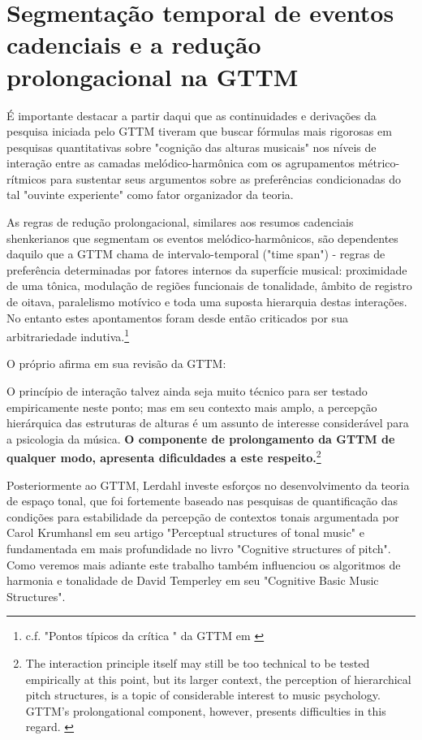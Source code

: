 \documentclass[
	12pt,				%
	openright,			%
	twoside,			%
	a4paper,			%
	english,			%
	french,				%
	spanish,			%
	brazil				%
	]{abntex2}
\begin{document}
\section{Segmentação temporal de eventos cadenciais e a redução prolongacional na GTTM}


É importante destacar a partir daqui que as continuidades e derivações da pesquisa iniciada pelo GTTM tiveram que buscar fórmulas mais rigorosas em pesquisas quantitativas sobre "cognição das alturas musicais"\cite{krumhansl1990cognitive} nos níveis de interação entre as camadas melódico-harmônica com os agrupamentos métrico-rítmicos para sustentar seus argumentos sobre as preferências condicionadas do tal "ouvinte experiente"\cite[pg. 118]{lerdahl1983generative} como fator organizador da teoria. 

As regras de redução prolongacional, similares aos resumos cadenciais shenkerianos que segmentam os eventos melódico-harmônicos, são dependentes daquilo que a GTTM chama de intervalo-temporal ("time span") - regras de preferência determinadas por fatores internos da superfície musical: proximidade de uma tônica, modulação de regiões funcionais de tonalidade, âmbito de registro de oitava, paralelismo motívico e toda uma suposta hierarquia destas interações. No entanto estes apontamentos foram desde então criticados por sua arbitrariedade indutiva.\footnote{ c.f. "Pontos típicos da crítica " da GTTM em \cite[pg. 35]{hansen2011legacy} }

O próprio  afirma em sua revisão da GTTM:


\begin{citacao}
O princípio de interação talvez ainda seja muito técnico para ser testado empiricamente neste ponto; mas em seu contexto mais amplo, a percepção hierárquica das estruturas de alturas é um assunto de interesse considerável para a psicologia da música.\textbf{ O componente de prolongamento da GTTM de qualquer modo, apresenta dificuldades a este respeito.}\cite[p. 191]{lerdahl2009genesis}\footnote{ The interaction principle itself may still be too technical to be tested empirically at this point, but its larger
context, the perception of hierarchical pitch structures, is a topic of considerable interest to music psychology. GTTM’s prolongational component, however, presents
difficulties in this regard. \cite[p. 191]{lerdahl2009genesis}}
\end{citacao}



Posteriormente ao GTTM, Lerdahl investe esforços no desenvolvimento da teoria de espaço tonal\cite{lerdahl1988tps}, que foi fortemente baseado nas pesquisas de quantificação das condições para estabilidade da percepção de contextos tonais argumentada por Carol Krumhansl em seu artigo "Perceptual structures of tonal music"\cite{krumhansl1983perceptual} e fundamentada em mais profundidade no livro "Cognitive structures of pitch"\cite{krumhansl1990cognitive}. Como veremos mais adiante este trabalho também influenciou os algoritmos de harmonia e tonalidade de David Temperley em seu "Cognitive Basic Music Structures"\cite{temperley2001cognition}. 
\end{document}
